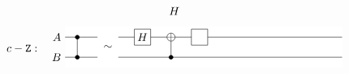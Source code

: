 \documentclass[a4paper,12pt,fleqn]{article}
\newcommand\cZ{c-\mathtt{Z}}
\begin{document}
\begin{figure}
\begin{equation}
{\begin{tikzpicture}[scale=1.200000,x=1pt,y=1pt]
\begin{scope}
\clip (99.000000, -0.000000) +(-45.000000:8.485281pt and 8.485281pt) -- +(45.000000:8.485281pt and 8.485281pt) -- +(135.000000:8.485281pt and 8.485281pt) -- +(225.000000:8.485281pt and 8.485281pt) -- cycle;
\draw (99.000000, -0.000000) node {$H$};
\end{scope}
\end{tikzpicture}
}
  \end{equation}
\begin{equation}\label{cZ}
  \cZ :\ \raisebox{-5mm}{
\begin{tikzpicture}[scale=1.200000,x=1pt,y=1pt]
\filldraw[color=white] (0.000000, -7.500000) rectangle (204.000000, 22.500000);
\draw[color=black] (0.000000,15.000000) -- (204.000000,15.000000);
\draw[color=black] (0.000000,15.000000) node[left] {$A$};
\draw[color=black] (0.000000,0.000000) -- (204.000000,0.000000);
\draw[color=black] (0.000000,0.000000) node[left] {$B$};
\draw (9.000000,15.000000) -- (9.000000,0.000000);
\filldraw (9.000000, 15.000000) circle(1.500000pt);
\filldraw (9.000000, 0.000000) circle(1.500000pt);
\draw[fill=white,color=white] (24.000000, -6.000000) rectangle (39.000000, 21.000000);
\draw (31.500000, 7.500000) node {$\sim$};
\begin{scope}
\draw[fill=white] (57.000000, 15.000000) +(-45.000000:8.485281pt and 8.485281pt) -- +(45.000000:8.485281pt and 8.485281pt) -- +(135.000000:8.485281pt and 8.485281pt) -- +(225.000000:8.485281pt and 8.485281pt) -- cycle;
\clip (57.000000, 15.000000) +(-45.000000:8.485281pt and 8.485281pt) -- +(45.000000:8.485281pt and 8.485281pt) -- +(135.000000:8.485281pt and 8.485281pt) -- +(225.000000:8.485281pt and 8.485281pt) -- cycle;
\draw (57.000000, 15.000000) node {$H$};
\end{scope}
\draw (78.000000,15.000000) -- (78.000000,0.000000);
\begin{scope}
\draw[fill=white] (78.000000, 15.000000) circle(3.000000pt);
\clip (78.000000, 15.000000) circle(3.000000pt);
\draw (75.000000, 15.000000) -- (81.000000, 15.000000);
\draw (78.000000, 12.000000) -- (78.000000, 18.000000);
\end{scope}
\filldraw (78.000000, 0.000000) circle(1.500000pt);
\begin{scope}
\draw[fill=white] (99.000000, 15.000000) +(-45.000000:8.485281pt and 8.485281pt) -- +(45.000000:8.485281pt and 8.485281pt) -- +(135.000000:8.485281pt and 8.485281pt) -- +(225.000000:8.485281pt and 8.485281pt) -- cycle;

\end{scope}
\end{tikzpicture}}
\end{equation}
\end{figure}
\end{document}
